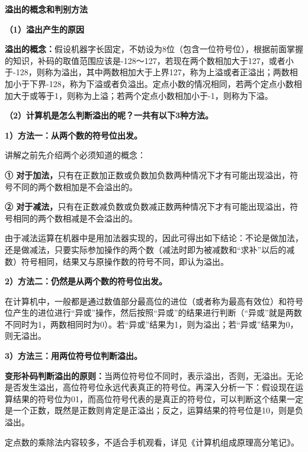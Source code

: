 \textbf{{溢出的概念和判别方法}}

\textbf{（1）溢出产生的原因}

\textbf{溢出的概念：}假设机器字长固定，不妨设为8位（包含一位符号位），根据前面掌握的知识，补码的取值范围应该是-128～127，若现在两个数相加大于127，或者小于-128，则称为溢出，其中两数相加大于上界127，称为上溢或者正溢出；两数相加小于下界-128，称为下溢或者负溢出。定点小数的情况相同，若两个定点小数相加大于或等于1，则称为上溢；若两个定点小数相加小于-1，则称为下溢。

\textbf{（2）计算机是怎么判断溢出的呢？一共有以下3种方法。}

\textbf{1）方法一：从两个数的符号位出发。}

讲解之前先介绍两个必须知道的概念：

\textbf{①
对于加法，}只有在正数加正数或负数加负数两种情况下才有可能出现溢出，符号不同的两个数相加是不会溢出的。

\textbf{②
对于减法，}只有在正数减负数或负数减正数两种情况下才有可能出现溢出，符号相同的两个数相减是不会溢出的。

由于减法运算在机器中是用加法器实现的，因此可得出如下结论：不论是做加法，还是做减法，只要实际参加操作的两个数（减法时即为被减数和``求补''以后的减数）符号相同，结果又与原操作数的符号不同，即认为溢出。

\textbf{2）方法二：仍然是从两个数的符号位出发。}

在计算机中，一般都是通过数值部分最高位的进位（或者称为最高有效位）和符号位产生的进位进行``异或''操作，然后按照``异或''的结果进行判断（``异或''就是两数不同时为1，两数相同时为0）。若``异或''结果为1，则为溢出；若``异或''结果为0，则无溢出。

\textbf{3）方法三：用两位符号位判断溢出。}

\textbf{变形补码判断溢出的原则：}当两位符号位不同时，表示溢出，否则，无溢出。无论是否发生溢出，高位符号位永远代表真正的符号位。再深入分析一下：假设现在运算结果的符号位为01，而高位符号代表的是真正的符号位，可以判断这个结果一定是一个正数，既然是正数则肯定是正溢出；反之，运算结果的符号位是10，则是负溢出。

{定点数的乘除法内容较多，不适合手机观看，详见《计算机组成原理高分笔记》。}
